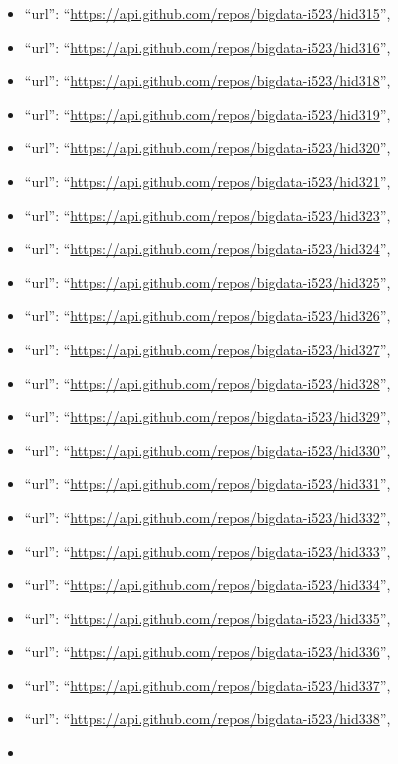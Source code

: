 \begin{itemize}
\item
  ``url'': ``\url{https://api.github.com/repos/bigdata-i523/hid315}'',
\item
  ``url'': ``\url{https://api.github.com/repos/bigdata-i523/hid316}'',
\item
  ``url'': ``\url{https://api.github.com/repos/bigdata-i523/hid318}'',
\item
  ``url'': ``\url{https://api.github.com/repos/bigdata-i523/hid319}'',
\item
  ``url'': ``\url{https://api.github.com/repos/bigdata-i523/hid320}'',
\item
  ``url'': ``\url{https://api.github.com/repos/bigdata-i523/hid321}'',
\item
  ``url'': ``\url{https://api.github.com/repos/bigdata-i523/hid323}'',
\item
  ``url'': ``\url{https://api.github.com/repos/bigdata-i523/hid324}'',
\item
  ``url'': ``\url{https://api.github.com/repos/bigdata-i523/hid325}'',
\item
  ``url'': ``\url{https://api.github.com/repos/bigdata-i523/hid326}'',
\item
  ``url'': ``\url{https://api.github.com/repos/bigdata-i523/hid327}'',
\item
  ``url'': ``\url{https://api.github.com/repos/bigdata-i523/hid328}'',
\item
  ``url'': ``\url{https://api.github.com/repos/bigdata-i523/hid329}'',
\item
  ``url'': ``\url{https://api.github.com/repos/bigdata-i523/hid330}'',
\item
  ``url'': ``\url{https://api.github.com/repos/bigdata-i523/hid331}'',
\item
  ``url'': ``\url{https://api.github.com/repos/bigdata-i523/hid332}'',
\item
  ``url'': ``\url{https://api.github.com/repos/bigdata-i523/hid333}'',
\item
  ``url'': ``\url{https://api.github.com/repos/bigdata-i523/hid334}'',
\item
  ``url'': ``\url{https://api.github.com/repos/bigdata-i523/hid335}'',
\item
  ``url'': ``\url{https://api.github.com/repos/bigdata-i523/hid336}'',
\item
  ``url'': ``\url{https://api.github.com/repos/bigdata-i523/hid337}'',
\item
  ``url'': ``\url{https://api.github.com/repos/bigdata-i523/hid338}'',
\item

\end{itemize}
